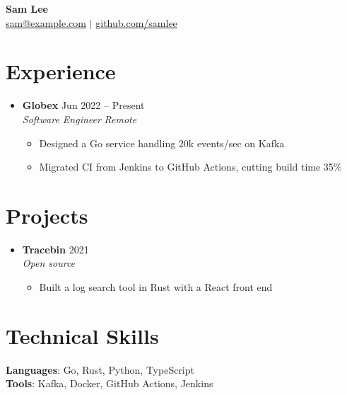 \documentclass[letterpaper,11pt]{article}
\newcommand{\resumeItem}[1]{\item\small{#1 \vspace{-2pt}}}
\newcommand{\resumeSubheading}[4]{\item \textbf{#1} \hfill #2 \\ \textit{\small #3} \hfill \textit{\small #4}}
\newcommand{\resumeSubHeadingListStart}{\begin{itemize}[leftmargin=0.15in, label={}]}
\newcommand{\resumeSubHeadingListEnd}{\end{itemize}}
\newcommand{\resumeItemListStart}{\begin{itemize}}
\newcommand{\resumeItemListEnd}{\end{itemize}\vspace{-5pt}}
\begin{document}
\begin{center}
{\Huge \textbf{Sam Lee}} \\ \href{mailto:sam@example.com}{sam@example.com} $|$ \href{https://github.com/samlee}{github.com/samlee}
\end{center}

\section{Experience}
\resumeSubHeadingListStart
  \resumeSubheading{Globex}{Jun 2022 -- Present}{Software Engineer}{Remote}
  \resumeItemListStart
    \resumeItem{Designed a Go service handling 20k events/sec on Kafka} %
    \resumeItem{Migrated CI from Jenkins to GitHub Actions, cutting build time 35\%}
  \resumeItemListEnd
\resumeSubHeadingListEnd

\section{Projects}
\resumeSubHeadingListStart
  \resumeSubheading{Tracebin}{2021}{Open source}{}
  \resumeItemListStart
    \resumeItem{Built a log search tool in Rust with a React front end}
  \resumeItemListEnd
\resumeSubHeadingListEnd

\section{Technical Skills}
\begin{itemize}[leftmargin=0.15in, label={}]
  \small{\item{
    \textbf{Languages}{: Go, Rust, Python, TypeScript} \\
    \textbf{Tools}{: Kafka, Docker, GitHub Actions, Jenkins}
  }}
\end{itemize}
\end{document}
